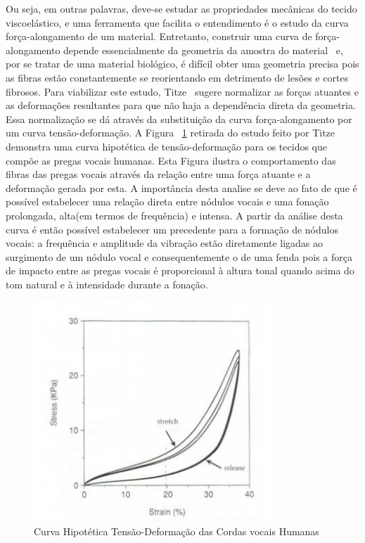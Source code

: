	Ou seja, em outras palavras, deve-se estudar as propriedades mecânicas do tecido viscoelástico, e uma ferramenta que facilita o entendimento é o estudo da curva força-alongamento de um material. Entretanto, construir uma curva de força-alongamento depende essencialmente da geometria da amostra do material~\cite{IngoTitze} e, por se tratar de uma material biológico, é difícil obter uma geometria precisa pois as ﬁbras estão constantemente se reorientando em detrimento de lesões e cortes ﬁbrosos. Para viabilizar este estudo, Titze~\cite{IngoTitze} sugere normalizar as forças atuantes e as deformações resultantes para que não haja a dependência direta da geometria. Essa normalização se dá através da substituição da curva força-alongamento por um curva tensão-deformação. A Figura ~\ref{fig:curvaTensao} retirada do estudo feito por Titze~\cite{IngoTitze} demonstra uma curva hipotética de tensão-deformação para os tecidos que compõe as pregas vocais humanas. Esta Figura ilustra o comportamento das ﬁbras das pregas vocais através da relação entre uma força atuante e a deformação gerada por esta. A importância desta analise se deve ao fato de que é possível estabelecer uma relação direta entre nódulos vocais e uma fonação prolongada, alta(em termos de frequência) e intensa. A partir da análise desta curva é então possível estabelecer um precedente para a formação de nódulos vocais: a frequência e amplitude da vibração estão diretamente ligadas ao surgimento de um nódulo vocal e consequentemente o de uma fenda pois a força de impacto entre as pregas vocais é proporcional à altura tonal quando acima do tom natural e à intensidade durante a fonação.
	
	
	\begin{figure}
		\includegraphics{figura1}
		\caption{ Curva Hipotética Tensão-Deformação das Cordas vocais Humanas~\cite{IngoTitze}}
		\label{fig:curvaTensao}
	\end{figure}
	
